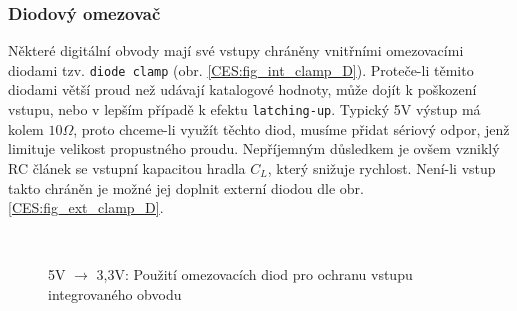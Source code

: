       \subsubsection{Diodový omezovač} %
        Některé digitální obvody mají své vstupy chráněny vnitřními omezovacími diodami tzv.
        \texttt{diode clamp} (obr. \ref{CES:fig_int_clamp_D}). Proteče-li těmito diodami větší proud
        než udávají katalogové hodnoty, může dojít k poškození vstupu, nebo v lepším případě k
        efektu \texttt{latching-up}. Typický 5V výstup má kolem $10 \Omega$, proto chceme-li využít
        těchto diod, musíme přidat sériový odpor, jenž limituje velikost propustného proudu.
        Nepříjemným důsledkem je ovšem vzniklý RC článek se vstupní kapacitou hradla $C_L$, který
        snižuje rychlost. Není-li vstup takto chráněn je možné jej doplnit externí diodou dle obr.
        \ref{CES:fig_ext_clamp_D}.
       \begin{figure}[ht!]
          \centering
            {}        \\
            {}
          \caption{5V $\rightarrow$ 3,3V: Použití omezovacích diod pro ochranu vstupu integrovaného
                  obvodu}
          \label{CES:fig_clamp_diodes}
       \end{figure} 
          
